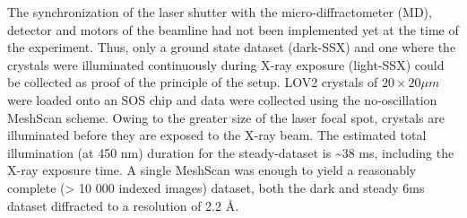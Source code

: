 The synchronization of the laser shutter with the micro-diffractometer (MD), detector and motors of the beamline had not been implemented yet at the time of the experiment. Thus, only a ground state dataset (dark-SSX) and one where the crystals were illuminated continuously during X-ray exposure (light-SSX) could be collected as proof of the principle of the setup. LOV2 crystals of \(20 \times 20 \mu m\) were loaded onto an SOS chip \parencite{doakCrystallographyChipChip2018} and data were collected using the no-oscillation MeshScan scheme. Owing to the greater size of the laser focal spot, crystals are illuminated before they are exposed to the X-ray beam. The estimated total illumination (at 450 nm) duration for the steady-dataset is \textasciitilde 38 ms, including the X-ray exposure time. A single MeshScan was enough to yield a reasonably complete (> 10 000 indexed images) dataset, both the dark and steady 6ms dataset diffracted to a resolution of 2.2 \AA. 

